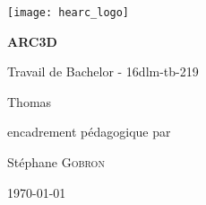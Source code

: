 \begin{titlepage}
	\centering
	\texttt{[image: hearc\_logo]}\par
	\vspace{1cm}
	{\scshape\Large \par}
	\vspace{1.5cm}
	{\huge\bfseries ARC3D\par}
	\vspace{0.5cm}
	{\small Travail de Bachelor - 16dlm-tb-219\par}
	\vspace{2cm}
	{\Large Thomas \par}
	\vfill
	encadrement pédagogique par\par
	Stéphane \textsc{Gobron}
	
	\vfill
	
	{\large \today\par}
\end{titlepage}